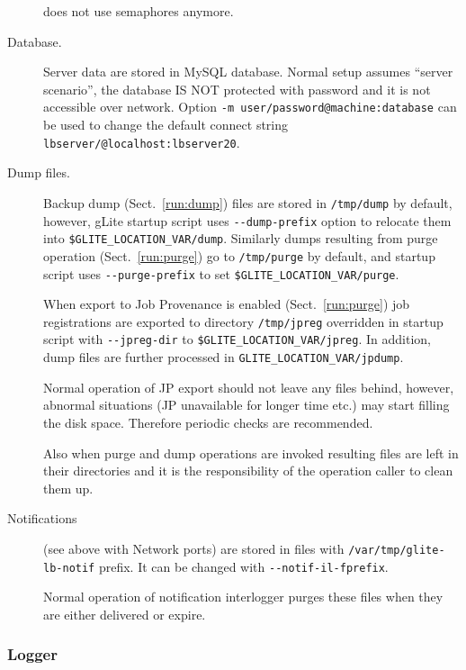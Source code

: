 \begin{description}
 does not use semaphores anymore.

\item[Database.]
Server data are stored in MySQL database. Normal setup assumes ``server scenario'', 
\ie the database IS NOT protected with password and it is not accessible over network.
Option \verb'-m user/password@machine:database' can be used to change
the default connect string \verb'lbserver/@localhost:lbserver20'.

\item[Dump files.]
Backup dump (Sect.~\ref{run:dump}) files are stored in
\verb'/tmp/dump' by default, however, gLite startup script uses
\verb'--dump-prefix' option to relocate them into \verb'$GLITE_LOCATION_VAR/dump'.
Similarly dumps resulting from purge operation (Sect.~\ref{run:purge})
go to \verb'/tmp/purge' by default, and startup script uses \verb'--purge-prefix'
to set \verb'$GLITE_LOCATION_VAR/purge'.

When export to Job Provenance is enabled (Sect.~\ref{run:purge})
job registrations are exported to directory \verb'/tmp/jpreg'
overridden in startup script with \verb'--jpreg-dir' to \verb'$GLITE_LOCATION_VAR/jpreg'.
In addition, dump files are further processed in \verb'GLITE_LOCATION_VAR/jpdump'.

Normal operation of JP export should not leave any files behind,
however, abnormal situations (JP unavailable for longer time etc.)
may start filling the disk space. Therefore periodic checks are
recommended.

Also when purge and dump operations are invoked resulting files are left in their
directories and it is the responsibility of the operation caller to clean them up.

\item[Notifications]
(see above with Network ports) are stored in files with \verb'/var/tmp/glite-lb-notif'
prefix. It can be changed with \verb'--notif-il-fprefix'.

Normal operation of notification interlogger purges these files when
they are either delivered or expire.

\end{description}

\subsubsection{Logger}

